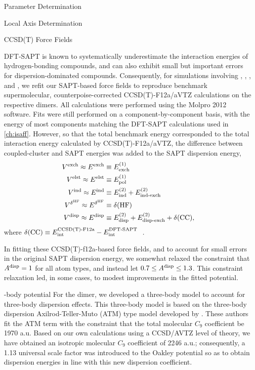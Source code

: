 \begin{subsection}{Parameter Determination}
\begin{subsubsection}{Local Axis Determination}
\end{subsubsection}
\begin{subsubsection}{CCSD(T) Force Fields}

DFT-SAPT is known to systematically underestimate the interaction energies of
hydrogen-bonding compounds, and can also exhibit small but important errors
for dispersion-dominated compounds.\cite{Parker2014} Consequently, for
simulations involving \co, \cl, \nh, and \ho, we refit our SAPT-based force
fields to reproduce benchmark supermolecular, counterpoise-corrected CCSD(T)-F12a/aVTZ
calculations on the respective dimers. All calculations were performed using
the Molpro 2012 software.\cite{MOLPRO} Fits were still performed on a
component-by-component basis, with the energy of most components matching the
DFT-SAPT calculations used in \cref{ch:isaff}.\cite{VanVleet2016} However, so that
the total benchmark energy corresponded to the total interaction energy
calculated by CCSD(T)-F12a/aVTZ, the difference between coupled-cluster and
SAPT energies was added to the SAPT dispersion energy,
%
\begin{align}
\begin{split}
V^{\text{exch}} \approx E^{\text{exch}} &\equiv E^{(1)}_{\text{exch}} \\
V^{\text{elst}} \approx E^{\text{elst}} &\equiv E^{(1)}_{\text{pol}} \\
V^{\text{ind}} \approx E^{\text{ind}} &\equiv E^{(2)}_{\text{ind}} + E^{(2)}_{\text{ind-exch}} \\
V^{\delta^{\text{HF}}} \approx E^{\delta^{\text{HF}}} &\equiv \delta(\text{HF}) \\
V^{\text{disp}} \approx E^{\text{disp}} &\equiv E^{(2)}_{\text{disp}} +
E^{(2)}_{\text{disp-exch}} + \delta(\text{CC}),
\end{split}
\end{align}
%
where $\delta(\text{CC}) \equiv E_{\text{int}}^{\text{CCSD(T)-F12a}} -
E_{\text{int}}^{\text{DFT-SAPT\phantom{()}}}$.
%

In fitting these CCSD(T)-f12a-based force fields, and to account for small
errors in the original SAPT dispersion energy, we somewhat relaxed the
constraint that $A^{\text{disp}}_{} = 1$ for all atom types, and instead let $ 0.7 \le
A^{\text{disp}}_{} \le 1.3$. This constraint relaxation led, in some cases, to modest
improvements in the fitted potential.


\end{subsubsection}

\begin{subsubsection}{-body potential}
For the \co dimer, we developed a three-body model to
account for three-body dispersion effects. This three-body model is based on
the three-body dispersion Axilrod-Teller-Muto (ATM) type model developed by . These
authors fit the ATM term with the constraint that the total molecular $C_9$
coefficient be 1970 a.u. Based on our own calculations using a CCSD/AVTZ
level of theory,\cite{Korona2011} we have obtained an
isotropic molecular $C_9$ coefficient of 2246 a.u.; consequently, a 1.13 universal
scale factor was introduced to the Oakley potential so as to obtain dispersion
energies in line with this new dispersion coefficient.
\end{subsubsection}


\end{subsection}
